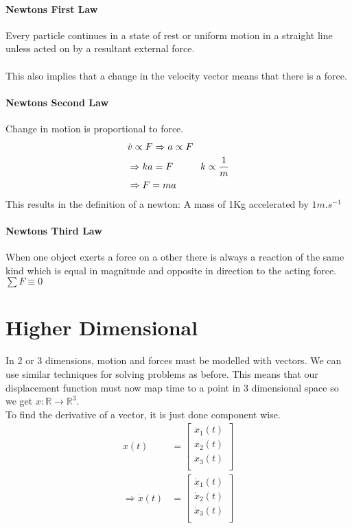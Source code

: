 \documentclass[class=article, crop=false]{standalone}
\begin{document}
\paragraph*{Newtons First Law}
Every particle continues in a state of rest or uniform motion in a straight line unless acted on by a resultant external force. \\\\
This also implies that a change in the velocity vector means that there is a force. 

\paragraph*{Newtons Second Law}
Change in motion is proportional to force. \\
\begin{align*}
& \dot{v} \propto F \Rightarrow a \propto F \\
& \Rightarrow ka = F \hspace*{1cm} k \propto \frac{1}{m} \\
& \Rightarrow F = ma \\
\end{align*}
This results in the definition of a newton: A mass of 1Kg accelerated by $1m.s^{-1}$

\paragraph*{Newtons Third Law}
When one object exerts a force on a other there is always a reaction of the same kind which is equal in magnitude and opposite in direction to the acting force. $\sum F \equiv 0$

\section*{Higher Dimensional}
In 2 or 3 dimensions, motion and forces must be modelled with vectors. We can use similar techniques for solving problems as before. This means that our displacement function must now map time to a point in 3 dimensional space so we get $x: \mathbb{R} \to \mathbb{R}^3$. \\

To find the derivative of a vector, it is just done component wise. 
\begin{align*}
x(t) & = \begin{bmatrix}
	x_1(t) \\
	x_2(t) \\
	x_3(t) \\
\end{bmatrix} \\
\Rightarrow \dot{x}(t) & = \begin{bmatrix}
	\dot{x}_1(t) \\
	\dot{x}_2(t) \\
	\dot{x}_3(t) \\
\end{bmatrix} \\
\end{align*}
\end{document}
